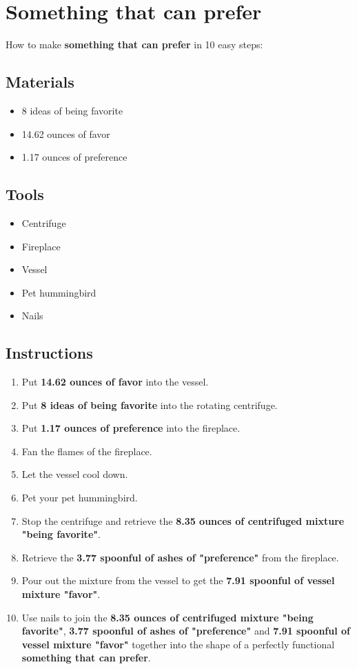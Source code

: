 \documentclass{article}
\begin{document}
\section{Something that can prefer}How to make \textbf{something that can prefer} in 10 easy steps:

\subsection{Materials}\begin{itemize}
\item 
8 ideas of being favorite
\item 
14.62 ounces of favor
\item 
1.17 ounces of preference
\end{itemize}
\subsection{Tools}\begin{itemize}
\item 
Centrifuge
\item 
Fireplace
\item 
Vessel
\item 
Pet hummingbird
\item 
Nails
\end{itemize}
\subsection{Instructions}\begin{enumerate}
\item 
Put \textbf{14.62 ounces of favor} into the vessel.
\item 
Put \textbf{8 ideas of being favorite} into the rotating centrifuge.
\item 
Put \textbf{1.17 ounces of preference} into the fireplace.
\item 
Fan the flames of the fireplace.
\item 
Let the vessel cool down.
\item 
Pet your pet hummingbird.
\item 
Stop the centrifuge and retrieve the \textbf{8.35 ounces of centrifuged mixture "being favorite"}.
\item 
Retrieve the \textbf{3.77 spoonful of ashes of "preference"} from the fireplace.
\item 
Pour out the mixture from the vessel to get the \textbf{7.91 spoonful of vessel mixture "favor"}.
\item 
Use nails to join the \textbf{8.35 ounces of centrifuged mixture "being favorite"}, \textbf{3.77 spoonful of ashes of "preference"} and \textbf{7.91 spoonful of vessel mixture "favor"} together into the shape of a perfectly functional \textbf{something that can prefer}.
\end{enumerate}
\newpage
\end{document}
